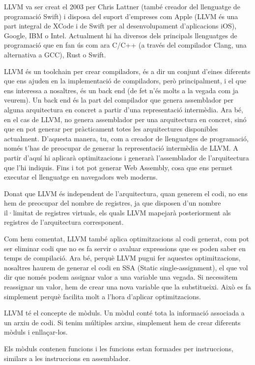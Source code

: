 ﻿\documentclass{article}
\begin{document}
LLVM va ser creat el 2003 per Chris Lattner (també creador del llenguatge de
programació Swift) i disposa del suport d'empreses com Apple (LLVM és una part
integral de XCode i de Swift per al desenvolupament d'aplicacions iOS), Google,
IBM o Intel. Actualment hi ha diversos dels principals llenguatges de
programació que en fan ús com ara C/C++ (a través del compilador Clang, una
alternativa a GCC), Rust o Swift.

LLVM és un toolchain per crear compiladors, és a dir un conjunt d'eines
diferents que ens ajuden en la implementació de compiladors, però principalment,
i el que ens interessa a nosaltres, és un back end (de fet n'és molts a la
vegada com ja veurem). Un back end és la part del compilador que genera
assemblador per alguna arquitectura en concret a partir d'una representació
intermèdia. Ara bé, en el cas de LLVM, no genera assemblador per una
arquitectura en concret, sinó que en pot generar per pràcticament totes les
arquitectures disponibles actualment. D'aquesta manera, tu, com a creador de
llenguatges de programació, només t'has de preocupar de generar la representació
intermèdia de LLVM. A partir d'aquí hi aplicarà optimitzacions i generarà
l'assemblador de l'arquitectura que l'hi indiquis. Fins i tot pot generar Web
Assembly, cosa que ens permet executar el llenguatge en navegadors web moderns.

Donat que LLVM és independent de l'arquitectura, quan generem el codi, no ens
hem de preocupar del nombre de registres, ja que disposen d'un nombre il·limitat
de registres virtuals, els quals LLVM mapejarà posteriorment als registres de
l'arquitectura corresponent.

Com hem comentat, LLVM també aplica optimitzacions al codi generat, com pot ser
eliminar codi que no es fa servir o avaluar expressions que es poden saber en
temps de compilació. Ara bé, perquè LLVM pugui fer aquestes optimitzacions, 
nosaltres haurem de generar el codi en SSA (Static single-assignment), el que vol
dir que només podem assignar valor a una variable una vegada. Si necessitem 
reassignar un valor, hem de crear una nova variable que la substitueixi. Això es
fa simplement perquè facilita molt a l'hora d'aplicar optimitzacions.

LLVM té el concepte de mòduls. Un mòdul conté tota la informació associada a un
arxiu de codi. Si tenim múltiples arxius, simplement hem de crear diferents 
mòduls i enllaçar-los.

Els mòduls contenen funcions i les funcions estan formades per instruccions, 
similars a les instruccions en assemblador.
\end{document}
